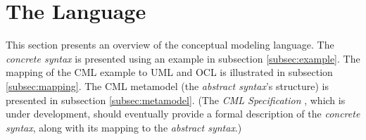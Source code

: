 \section{The Language}\label{sec:lang}
%
This section presents an overview of the conceptual modeling language.
The \emph{concrete syntax} is presented using an example in subsection \ref{subsec:example}.
The mapping of the CML example to UML \cite{uml} and OCL \cite{ocl} is illustrated in subsection \ref{subsec:mapping}.
The CML metamodel (the \emph{abstract syntax}'s structure) is presented in subsection \ref{subsec:metamodel}.
(The \emph{CML Specification} \cite{cml-repo}, which is under development,
should eventually provide a formal description of the \emph{concrete syntax},
along with its mapping to the \emph{abstract syntax}.)




